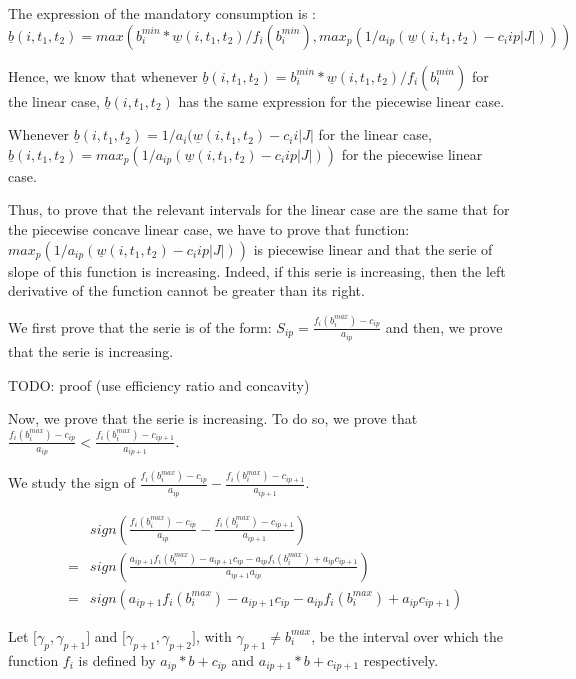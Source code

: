 \documentclass{article}
\begin{document}
The expression of the mandatory consumption is :
\[ \underline{b}(i,t_1,t_2)= max( 
b_i^{min} * \underline{w}(i,t_1,t_2)/f_i(b_i^{min}),
max_p(1/a_{ip} (\underline{w}(i,t_1,t_2) -c_i{ip}|J|)))
\]

Hence, we know that whenever $\underline{b}(i,t_1,t_2)=
b_i^{min} * \underline{w}(i,t_1,t_2)/f_i(b_i^{min})$ for the linear case, 
$\underline{b}(i,t_1,t_2)$ has the same expression for the piecewise linear case. 

Whenever $\underline{b}(i,t_1,t_2)=
1/a_{i} (\underline{w}(i,t_1,t_2) -c_i{i}|J|$ for the linear case, 
$\underline{b}(i,t_1,t_2)=
max_p(1/a_{ip} (\underline{w}(i,t_1,t_2) -c_i{ip}|J|))$ for the piecewise 
linear case.

Thus, to prove that the relevant intervals for the linear case are the same 
that for the piecewise concave linear case, we have to prove that function: 
$max_p(1/a_{ip} (\underline{w}(i,t_1,t_2) -c_i{ip}|J|))$ is piecewise linear 
and that the serie of slope of this function is increasing. Indeed, if this 
serie is increasing, then the left derivative of the function cannot be greater 
than its right.

We first prove that the serie is of the form: $S_{ip}= \frac{f_i(b_i^{max})- c_{ip}}
{a_{ip}}$ and then, we prove that the serie is increasing.

{\color{red} \Huge TODO: proof (use efficiency ratio and concavity)}


Now, we prove that the serie is increasing. To do so, we prove that 
$\frac{f_i(b_i^{max}) - c_{ip}}{a_{ip}} < 
\frac{f_i(b_i^{max}) - c_{ip+1}}{a_{ip+1}}$.

We study the sign of $\frac{f_i(b_i^{max}) - c_{ip}}{a_{ip}} - 
\frac{f_i(b_i^{max}) - c_{ip+1}}{a_{ip+1}}$.

\begin{align*}
 & & sign(\frac{f_i(b_i^{max}) - c_{ip}}{a_{ip}} - 
\frac{f_i(b_i^{max}) - c_{ip+1}}{a_{ip+1}})\\
 &=& sign(\frac{a_{ip+1}f_i(b_i^{max}) - a_{ip+1}c_{ip}-a_{ip}f_i(b_i^{max}) + a_{ip}c_{ip+1}}{a_{ip+1}a_{ip}})\\ 
 &=& sign(a_{ip+1}f_i(b_i^{max}) - a_{ip+1}c_{ip}-a_{ip}f_i(b_i^{max}) + a_{ip}c_{ip+1})
 \end{align*}

Let ${[}\gamma_p,\gamma_{p+1}{]}$ and ${[}\gamma_{p+1},\gamma_{p+2}{]}$, with 
$\gamma_{p+1}\neq b_i^{max}$, be 
the interval over which the function $f_i$ is defined by $a_{ip}*b+c_{ip}$ and 
$a_{ip+1}*b+c_{ip+1}$ respectively.
\end{document}

